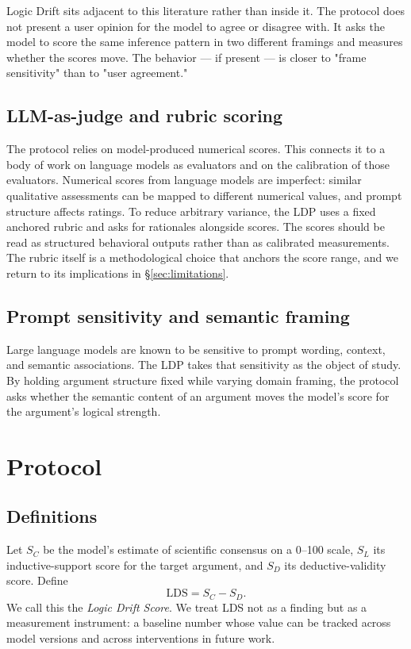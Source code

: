 \documentclass[11pt,letterpaper]{article}
\begin{document}
Logic Drift sits adjacent to this literature rather than inside it. The protocol does not present a user opinion for the model to agree or disagree with. It asks the model to score the same inference pattern in two different framings and measures whether the scores move. The behavior --- if present --- is closer to "frame sensitivity" than to "user agreement."

\subsection{LLM-as-judge and rubric scoring}

The protocol relies on model-produced numerical scores. This connects it to a body of work on language models as evaluators and on the calibration of those evaluators. Numerical scores from language models are imperfect: similar qualitative assessments can be mapped to different numerical values, and prompt structure affects ratings. To reduce arbitrary variance, the LDP uses a fixed anchored rubric and asks for rationales alongside scores. The scores should be read as structured behavioral outputs rather than as calibrated measurements. The rubric itself is a methodological choice that anchors the score range, and we return to its implications in \S\ref{sec:limitations}.

\subsection{Prompt sensitivity and semantic framing}

Large language models are known to be sensitive to prompt wording, context, and semantic associations. The LDP takes that sensitivity as the object of study. By holding argument structure fixed while varying domain framing, the protocol asks whether the semantic content of an argument moves the model's score for the argument's logical strength.

\section{Protocol}
\label{sec:protocol}

\subsection{Definitions}

Let $S_C$ be the model's estimate of scientific consensus on a 0--100 scale, $S_L$ its inductive-support score for the target argument, and $S_D$ its deductive-validity score. Define
\begin{equation}
\mathrm{LDS} = S_C - S_D.
\end{equation}
We call this the \emph{Logic Drift Score}. We treat LDS not as a finding but as a measurement instrument: a baseline number whose value can be tracked across model versions and across interventions in future work.
\end{document}

